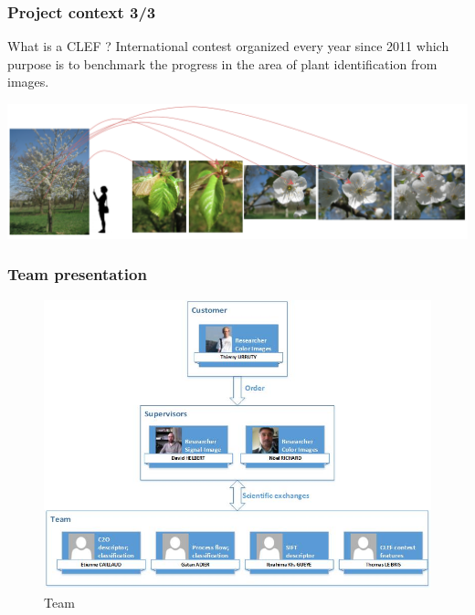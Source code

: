 \documentclass[xcolor=table]{beamer}
\begin{document}
\begin{frame} \frametitle{Project context 3/3}
\begin{block}{What is a CLEF ?}
	International contest organized every year since 2011 which purpose is to benchmark the progress in the area of plant identification from images.
\end{block}

	\includegraphics[scale=0.27]{OnePrunus.png}
\end{frame}

\begin{frame} \frametitle{Team presentation}

\begin{figure}[h]
    \center
    \includegraphics[scale=0.5]{Dessin1.jpg}
    \caption{Team}\label{fig:team}
\end{figure}

\end{frame}
\end{document}
